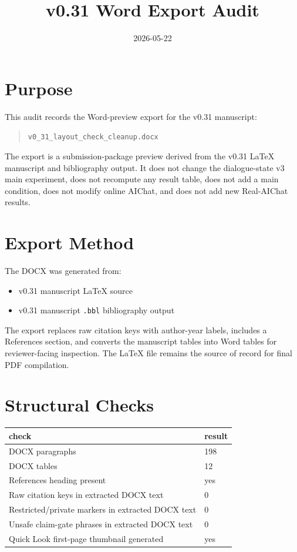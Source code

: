 \documentclass[11pt]{article}
\title{v0.31 Word Export Audit}
\author{}
\date{2026-05-22}
\begin{document}
\maketitle

\section*{Purpose}

This audit records the Word-preview export for the v0.31 manuscript:
\begin{quote}
\texttt{v0\_31\_layout\_check\_cleanup.docx}
\end{quote}
The export is a submission-package preview derived from the v0.31 \LaTeX{} manuscript and bibliography output. It does not change the dialogue-state v3 main experiment, does not recompute any result table, does not add a main condition, does not modify online AIChat, and does not add new Real-AIChat results.

\section*{Export Method}

The DOCX was generated from:
\begin{itemize}
\item v0.31 manuscript \LaTeX{} source
\item v0.31 manuscript \texttt{.bbl} bibliography output
\end{itemize}
The export replaces raw citation keys with author-year labels, includes a References section, and converts the manuscript tables into Word tables for reviewer-facing inspection. The \LaTeX{} file remains the source of record for final PDF compilation.

\section*{Structural Checks}

\begin{tabular}{ll}
\toprule
check & result \\
\midrule
DOCX paragraphs & 198 \\
DOCX tables & 12 \\
References heading present & yes \\
Raw citation keys in extracted DOCX text & 0 \\
Restricted/private markers in extracted DOCX text & 0 \\
Unsafe claim-gate phrases in extracted DOCX text & 0 \\
Quick Look first-page thumbnail generated & yes \\
\bottomrule
\end{tabular}
\end{document}
